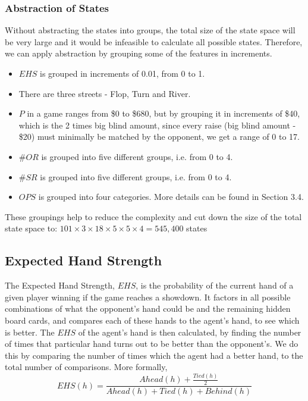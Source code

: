 \documentclass{article}
\begin{document}
\subsubsection{Abstraction of States}
Without abstracting the states into groups, the total size of the state space will be very large and it would be infeasible to calculate all possible states. Therefore, we can apply abstraction by grouping some of the features in increments.
\begin{itemize}
  \item $EHS$ is grouped in increments of 0.01, from 0 to 1.
  \item There are three streets - Flop, Turn and River.
  \item $P$ in a game ranges from \$0 to \$680, but by grouping it in increments of \$40, which is the 2 times big blind amount, since every raise (big blind amount - \$20) must minimally be matched by the opponent, we get a range of 0 to 17.
  \item $\#OR$ is grouped into five different groups, i.e. from 0 to 4.
  \item $\#SR$ is grouped into five different groups, i.e. from 0 to 4.
  \item $OPS$ is grouped into four categories. More details can be found in Section 3.4.
\end{itemize}

These groupings help to reduce the complexity and cut down the size of the total state space to: $101 \times 3 \times 18 \times 5 \times 5 \times 4 = 545,400$ states


\subsection{Expected Hand Strength}

The Expected Hand Strength, $EHS$, is the probability of the current hand of a given player winning if the game reaches a showdown. It factors in all possible combinations of what the opponent's hand could be and the remaining hidden board cards, and compares each of these hands to the agent's hand, to see which is better. The $EHS$ of the agent's hand is then calculated, by finding the number of times that particular hand turns out to be better than the opponent's. We do this by comparing the number of times which the agent had a better hand, to the total number of comparisons. More formally,
\begin{displaymath}
  EHS(h)= \frac{Ahead(h)+\frac{Tied(h)}{2}}{Ahead(h) + Tied(h) + Behind(h)}
\end{displaymath}
\end{document}
